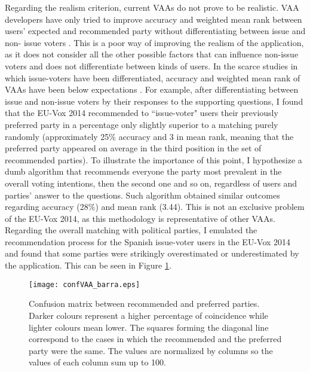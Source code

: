 \documentclass{scrartcl}
\begin{document}
Regarding the realism criterion, current VAAs do not prove to be realistic. VAA developers have only tried to improve accuracy and weighted mean rank between users' expected and recommended party without differentiating between issue and non- issue voters \cite{louwerse2014design}. This is a poor way of improving the realism of the application, as it does not consider all the other possible factors that can influence non-issue voters and does not differentiate between kinds of users. In the scarce studies in which issue-voters have been differentiated, accuracy and weighted mean rank of VAAs have been below expectations \cite{Mendez2017}. For example, after differentiating between issue and non-issue voters by their responses to the supporting questions, I found that the EU-Vox 2014 recommended to ``issue-voter" users their previously preferred party in a percentage only slightly superior to a matching purely randomly (approximately 25\% accuracy and 3 in mean rank, meaning that the preferred party appeared on average in the third position in the set of recommended parties). To illustrate the importance of this point, I hypothesize a dumb algorithm that recommends everyone the party most prevalent in the overall voting intentions, then the second one and so on, regardless of users and parties' answer to the questions. Such algorithm obtained similar outcomes regarding accuracy (28\%) and mean rank (3.44). This is not an exclusive problem of the EU-Vox 2014, as this methodology is representative of other VAAs. Regarding the overall matching with political parties, I emulated the recommendation process for the Spanish issue-voter users in the EU-Vox 2014 and found that some parties were strikingly overestimated or underestimated by the application. This can be seen in Figure \ref{fig:Matrix}.

\begin{figure}[h]
    \centering 
    \texttt{[image: confVAA\_barra.eps]}
    \caption{Confusion matrix between recommended and preferred parties. Darker colours represent a higher percentage of coincidence while lighter colours mean lower. The squares forming the diagonal line correspond to the cases in which the recommended and the preferred party were the same. The values are normalized by columns so the values of each column sum up to 100.}
    \label{fig:Matrix}
\end{figure}
\end{document}

